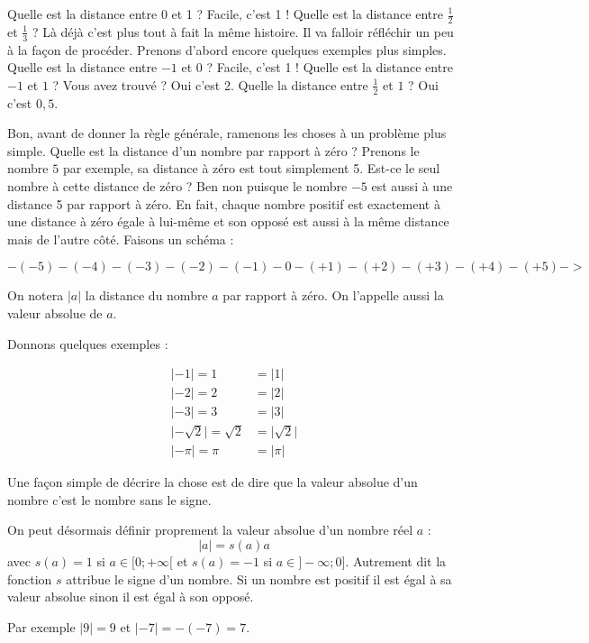 \documentclass[a4paper, 11pt, twoside]{article}
\begin{document}
Quelle est la distance entre 0 et 1 ? Facile, c'est 1 ! Quelle est
la distance entre \(\frac{1}{2}\) et \(\frac{1}{3}\) ? Là déjà c'est
plus tout à fait la même histoire. Il va falloir réfléchir un peu à
la façon de procéder. Prenons d'abord encore quelques exemples plus
simples. Quelle est la distance entre \(-1\) et 0 ? Facile, c'est 1 !
Quelle est la distance entre \(-1\) et \(1\) ? Vous avez trouvé ? Oui
c'est 2. Quelle la distance entre \(\frac{1}{2}\) et \(1\) ? Oui c'est
\(0,5\).

Bon, avant de donner la règle générale, ramenons les choses à un
problème plus simple. Quelle est la distance d'un nombre par
rapport à zéro ? Prenons le nombre \(5\) par exemple, sa distance à
zéro est tout simplement 5. Est-ce le seul nombre à cette distance
de zéro ? Ben non puisque le nombre \(-5\) est aussi à une distance 5
par rapport à zéro. En fait, chaque nombre positif est exactement à
une distance à zéro égale à lui-même et son opposé est aussi à la
même distance mais de l'autre côté. Faisons un schéma :

\[-(-5)-(-4)-(-3)-(-2)-(-1)-0-(+1)-(+2)-(+3)-(+4)-(+5)->\]

On notera \(|a|\) la distance du nombre \(a\) par rapport à zéro. On
l'appelle aussi la valeur absolue de \(a\).

Donnons quelques exemples :

\begin{align*}
\lvert -1 \rvert = 1& = \lvert 1 \rvert \\
\lvert -2 \rvert = 2& = \lvert 2 \rvert \\
\lvert -3 \rvert = 3& = \lvert 3 \rvert \\
\lvert -\sqrt{2} \rvert = \sqrt{2}& = \lvert \sqrt{2} \rvert \\
\lvert -\pi \rvert = \pi& = \lvert \pi \rvert
\end{align*}

Une façon simple de décrire la chose est de dire que la valeur
absolue d'un nombre c'est le nombre sans le signe.

On peut désormais définir proprement la valeur absolue d'un nombre
réel \(a\) : \[\lvert a \rvert = s(a)a\] avec \(s(a) = 1\) si \(a\in[0 ;
   +\infty[\) et \(s(a) = -1\) si \(a\in ]-\infty ; 0]\). Autrement dit la
fonction \(s\) attribue le signe d'un nombre. Si un nombre est
positif il est égal à sa valeur absolue sinon il est égal à son
opposé.

Par exemple \(\lvert 9 \rvert = 9\) et \(\lvert -7\rvert = -(-7) = 7\).
\end{document}
